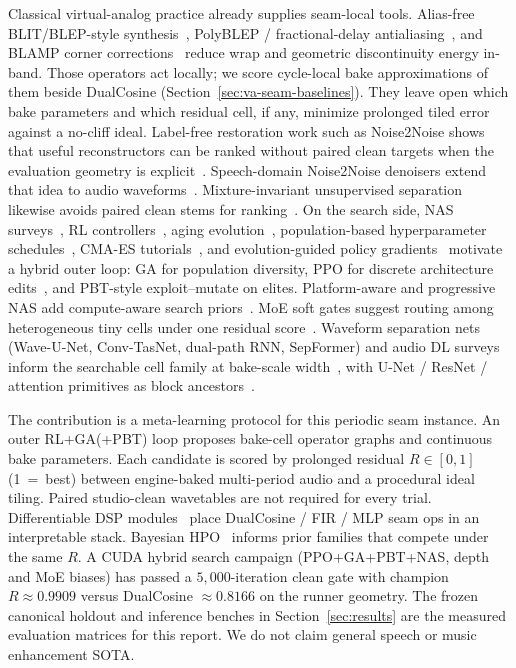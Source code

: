Classical virtual-analog practice already supplies seam-local tools.
Alias-free BLIT/BLEP-style synthesis~\cite{stilson1996}, PolyBLEP / fractional-delay antialiasing~\cite{nam2009polyblep}, and BLAMP corner corrections~\cite{esqueda2016blamp} reduce wrap and geometric discontinuity energy in-band.
Those operators act locally; we score cycle-local bake approximations of them beside DualCosine (Section~\ref{sec:va-seam-baselines}).
They leave open which bake parameters and which residual cell, if any, minimize prolonged tiled error against a no-cliff ideal.
Label-free restoration work such as Noise2Noise shows that useful reconstructors can be ranked without paired clean targets when the evaluation geometry is explicit~\cite{lehtinen2018}.
Speech-domain Noise2Noise denoisers extend that idea to audio waveforms~\cite{kashyap2021n2n}.
Mixture-invariant unsupervised separation likewise avoids paired clean stems for ranking~\cite{wisdom2020}.
On the search side, NAS surveys~\cite{elsken2019}, RL controllers~\cite{zoph2017nas,pham2018}, aging evolution~\cite{real2017large,real2019}, population-based hyperparameter schedules~\cite{jaderberg2017}, CMA-ES tutorials~\cite{hansen2016cmaes}, and evolution-guided policy gradients~\cite{khadka2018} motivate a hybrid outer loop: GA for population diversity, PPO for discrete architecture edits~\cite{schulman2017}, and PBT-style exploit--mutate on elites.
Platform-aware and progressive NAS add compute-aware search priors~\cite{tan2019mnasnet,liu2018pnas}.
MoE soft gates suggest routing among heterogeneous tiny cells under one residual score~\cite{shazeer2017}.
Waveform separation nets (Wave-U-Net, Conv-TasNet, dual-path RNN, SepFormer) and audio DL surveys inform the searchable cell family at bake-scale width~\cite{stoller2018,macartney2018,luo2019,luo2020dprnn,subakan2021,purwins2019,gong2021ast}, with U-Net / ResNet / attention primitives as block ancestors~\cite{ronneberger2015,he2016resnet,vaswani2017,jansson2017}.

The contribution is a meta-learning protocol for this periodic seam instance.
An outer RL+GA(+PBT) loop proposes bake-cell operator graphs and continuous bake parameters.
Each candidate is scored by prolonged residual $R\in[0,1]$ (1~=~best) between engine-baked multi-period audio and a procedural ideal tiling.
Paired studio-clean wavetables are not required for every trial.
Differentiable DSP modules~\cite{engel2020} place DualCosine / FIR / MLP seam ops in an interpretable stack.
Bayesian HPO~\cite{snoek2012} informs prior families that compete under the same $R$.
A CUDA hybrid search campaign (PPO+GA+PBT+NAS, depth and MoE biases) has passed a $5{,}000$-iteration clean gate with champion $R\approx 0.9909$ versus DualCosine $\approx 0.8166$ on the runner geometry.
The frozen canonical holdout and inference benches in Section~\ref{sec:results} are the measured evaluation matrices for this report.
We do not claim general speech or music enhancement SOTA.

